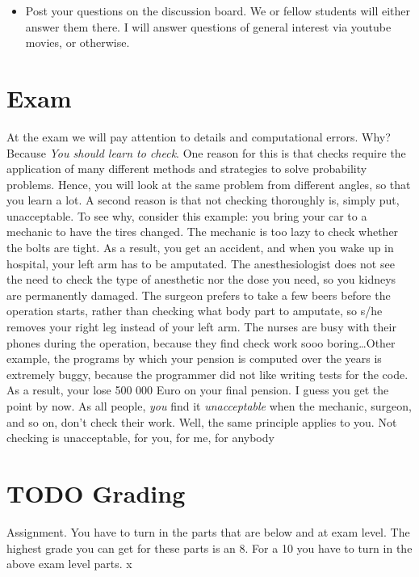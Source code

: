 \documentclass[a4paper]{article}
\theoremstyle{definition}
\newcommand{\1}[1]{\,I_{#1}} %
\begin{document}
\begin{itemize}
\item Post your questions on the discussion board. We or fellow students will either answer them there. I will answer questions of general interest via youtube movies, or otherwise.
\end{itemize}

\section{Exam}
\label{sec:org9bf1fc2}

At the exam we will pay attention to details and computational errors. Why? Because \emph{You should learn to check}.
One reason for this is that checks require the application of many different methods and strategies to solve probability problems.
Hence, you will look at the same problem from different angles, so that you learn a lot.
A second reason is that not checking thoroughly is, simply put, unacceptable. 
To see why, consider this example:  you bring your car to a mechanic to have the tires changed.
The mechanic is too lazy to check whether the bolts are tight.
As a result, you get an accident, and when you wake up in hospital, your left arm has to be amputated.
The anesthesiologist does not see the need to check the type of anesthetic nor the dose you need, so you kidneys are permanently damaged.
The surgeon prefers to take a few beers before the operation starts, rather than checking what body part to amputate, so s/he removes your right leg instead of your left arm.
The nurses are busy with their phones during the operation, because they find check work sooo boring\ldots Other example, the programs by which your pension is computed over the years is extremely buggy, because the programmer did not like writing tests for the code.
As a result, your lose 500 000 Euro on your final pension.
I guess you get the point by now.
As all people, \emph{you} find it \emph{unacceptable} when the mechanic, surgeon, and so on, don't check their work.
Well, the same principle applies to you.
Not checking is unacceptable, for you, for me, for anybody




\section{{\bfseries\sffamily TODO} Grading}
\label{sec:org24e7381}

Assignment.
You have to turn in the parts that are below and at exam level.
The highest grade you can get for these parts is an 8.
For a 10 you have to turn in the above exam level parts. x
\end{document}

